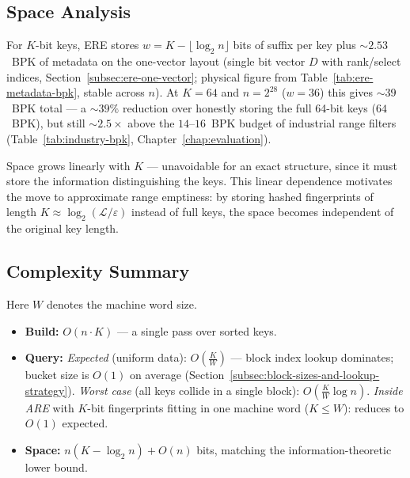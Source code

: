 \subsection{Space Analysis}

For $K$-bit keys, ERE stores $w = K - \lfloor \log_2 n \rfloor$ bits of
suffix per key plus ${\sim}2.53$~BPK of metadata on the one-vector
layout (single bit vector $D$ with rank/select indices,
Section~\ref{subsec:ere-one-vector}; physical figure from
Table~\ref{tab:ere-metadata-bpk}, stable across $n$).
At $K = 64$ and $n = 2^{28}$ ($w = 36$) this gives ${\sim}39$~BPK total
--- a ${\sim}39\%$ reduction over honestly storing the full 64-bit keys
($64$~BPK), but still ${\sim}2.5\times$ above the $14$--$16$~BPK budget
of industrial range filters
(Table~\ref{tab:industry-bpk}, Chapter~\ref{chap:evaluation}).

Space grows linearly with $K$ --- unavoidable for an exact structure,
since it must store the information distinguishing the keys.
This linear dependence motivates the move to approximate range emptiness:
by storing hashed fingerprints of length
$K \approx \log_2(\mathcal{L}/\varepsilon)$ instead of full keys, the
space becomes independent of the original key length.

\subsection{Complexity Summary}

Here $W$ denotes the machine word size.

\begin{itemize}
    \item \textbf{Build:} $O(n \cdot K)$ --- a single pass over sorted keys.
    \item \textbf{Query:}
    \subitem \emph{Expected} (uniform data): $O(\frac{K}{W})$ --- block index lookup
    dominates; bucket size is $O(1)$ on average
    (Section~\ref{subsec:block-sizes-and-lookup-strategy}).
    \subitem \emph{Worst case} (all keys collide in a single block):
    $O(\frac{K}{W} \log n)$.
    \subitem \emph{Inside ARE} with $K$-bit fingerprints fitting in one machine
    word ($K \leq W$): reduces to $O(1)$ expected.
    \item \textbf{Space:} $n (K - \log_2 n) + O(n)$ bits, matching the information-theoretic
    lower bound.
\end{itemize}
